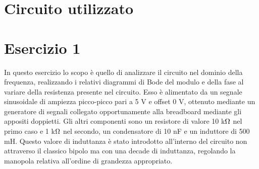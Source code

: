 \section{Circuito utilizzato}
\begin{figure}[!ht]
\centering %
%

\label{fig:my_label}
\end{figure}

\section{Esercizio 1}

In questo esercizio lo scopo è quello di analizzare il circuito nel dominio della frequenza, realizzando i relativi
diagrammi di Bode del modulo e della fase al variare della resistenza presente nel circuito. Esso è alimentato
da un segnale sinusoidale di ampiezza picco-picco pari a 5 V e offset 0 V, ottenuto mediante un generatore di
segnali collegato opportunamente alla breadboard mediante gli appositi doppietti. Gli altri componenti sono
un resistore di valore 10 k$\ohm$ nel primo caso e 1 k$\ohm$ nel secondo, un condensatore di 10 nF e un induttore di
500 mH. Questo valore di induttanza è stato introdotto all’interno del circuito non attraverso il classico bipolo
ma con una decade di induttanza, regolando la manopola relativa all’ordine di grandezza appropriato.

